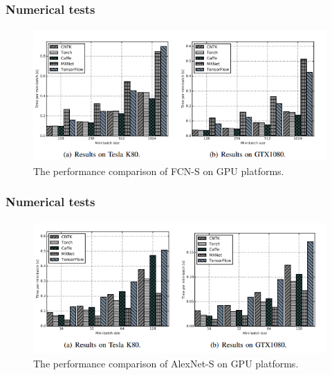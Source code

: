 %

\begin{frame}
	\MyLogo
	\frametitle{Numerical tests}  
	\begin{figure}[htbp] 
		\includegraphics[height=2in]{figures/FCN-S2.png} 
		\caption{The performance comparison of FCN-S on GPU platforms.}
	\end{figure}
\end{frame}

%

\begin{frame}
	\MyLogo
	\frametitle{Numerical tests}  
	\begin{figure}[htbp] 
		\includegraphics[height=2in]{figures/AlexNet-S2.png} 
		\caption{The performance comparison of AlexNet-S on GPU platforms.}
	\end{figure}
\end{frame}